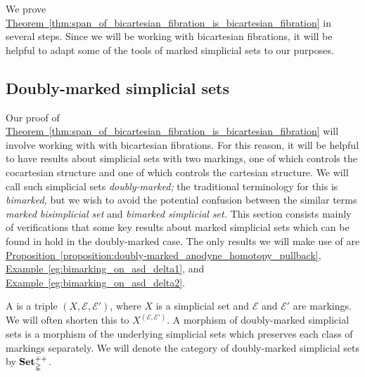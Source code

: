 \documentclass[main.tex]{subfiles}
\begin{document}
We prove \hyperref[thm:span_of_bicartesian_fibration_is_bicartesian_fibration]{Theorem~\ref*{thm:span_of_bicartesian_fibration_is_bicartesian_fibration}} in several steps. Since we will be working with bicartesian fibrations, it will be helpful to adapt some of the tools of marked simplicial sets to our purposes.

\subsection{Doubly-marked simplicial sets}
\label{ssc:doubly-marked_simplicial_sets}

Our proof of \hyperref[thm:span_of_bicartesian_fibration_is_bicartesian_fibration]{Theorem~\ref*{thm:span_of_bicartesian_fibration_is_bicartesian_fibration}} will involve working with with bicartesian fibrations. For this reason, it will be helpful to have results about simplicial sets with two markings, one of which controls the cocartesian structure and one of which controls the cartesian structure. We will call such simplicial sets \emph{doubly-marked;} the traditional terminology for this is \emph{bimarked,} but we wish to avoid the potential confusion between the similar terms \emph{marked bisimplicial set} and \emph{bimarked simplicial set.} This section consists mainly of verifications that some key results about marked simplicial sets which can be found in \cite[Sec.\ 3.1]{highertopostheory} hold in the doubly-marked case. The only results we will make use of are \hyperref[proposition:doubly-marked_anodyne_homotopy_pullback]{Proposition~\ref*{proposition:doubly-marked_anodyne_homotopy_pullback}}, \hyperref[eg:bimarking_on_asd_delta1]{Example~\ref*{eg:bimarking_on_asd_delta1}}, and \hyperref[eg:bimarking_on_asd_delta2]{Example~\ref*{eg:bimarking_on_asd_delta2}}.

\begin{definition}
  A  is a triple $(X, \mathcal{E}, \mathcal{E}')$, where $X$ is a simplicial set and $\mathcal{E}$ and $\mathcal{E}'$ are markings. We will often shorten this to $X^{(\mathcal{E}, \mathcal{E}')}$. A morphism of doubly-marked simplicial sets is a morphism of the underlying simplicial sets which preserves each class of markings separately. We will denote the category of doubly-marked simplicial sets by $\mathbf{Set}_{\mathbb{\Delta}}^{++}$.
\end{definition}
\end{document}
